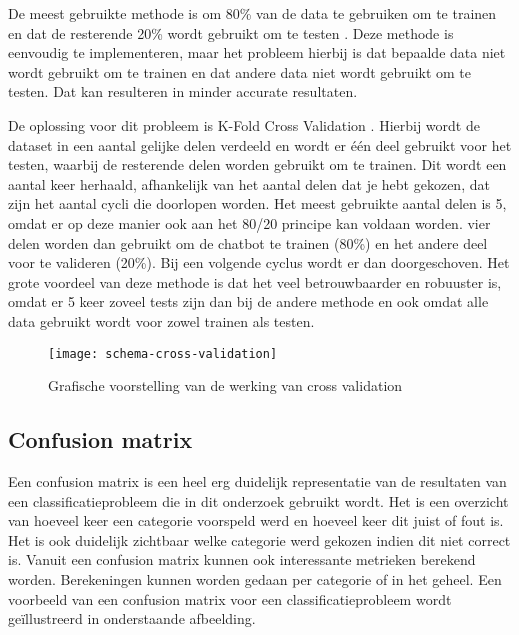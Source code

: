 De meest gebruikte methode is om 80\% van de data te gebruiken om te trainen en dat de resterende 20\% wordt gebruikt om te testen \autocite{Desmarais2018}. Deze methode is eenvoudig te implementeren, maar het probleem hierbij is dat bepaalde data niet wordt gebruikt om te trainen en dat andere data niet wordt gebruikt om te testen. Dat kan resulteren in minder accurate resultaten.

De oplossing voor dit probleem is K-Fold Cross Validation \autocite{Desmarais2018}. Hierbij wordt de dataset in een aantal gelijke delen verdeeld en wordt er één deel gebruikt voor het testen, waarbij de resterende delen worden gebruikt om te trainen. Dit wordt een aantal keer herhaald, afhankelijk van het aantal delen dat je hebt gekozen, dat zijn het aantal cycli die doorlopen worden. Het meest gebruikte aantal delen is 5, omdat er op deze manier ook aan het 80/20 principe kan voldaan worden. vier delen worden dan gebruikt om de chatbot te trainen (80\%) en het andere deel voor te valideren (20\%). Bij een volgende cyclus wordt er dan doorgeschoven. Het grote voordeel van deze methode is dat het veel betrouwbaarder en robuuster is, omdat er 5 keer zoveel tests zijn dan bij de andere methode en ook omdat alle data gebruikt wordt voor zowel trainen als testen.

\begin{figure}[H]
    \label{fig:cross-validation-schema}
    \centering
    \texttt{[image: schema-cross-validation]}
    \caption{Grafische voorstelling van de werking van cross validation}
\end{figure}

\subsection{Confusion matrix}
\label{subsec:validatie-confusion-matrix}

Een confusion matrix is een heel erg duidelijk representatie van de resultaten van een classificatieprobleem die in dit onderzoek gebruikt wordt. Het is een overzicht van hoeveel keer een categorie voorspeld werd en hoeveel keer dit juist of fout is. Het is ook duidelijk zichtbaar welke categorie werd gekozen indien dit niet correct is. Vanuit een confusion matrix kunnen ook interessante metrieken berekend worden. Berekeningen kunnen worden gedaan per categorie of in het geheel. Een voorbeeld van een confusion matrix voor een classificatieprobleem wordt geïllustreerd in onderstaande afbeelding.

